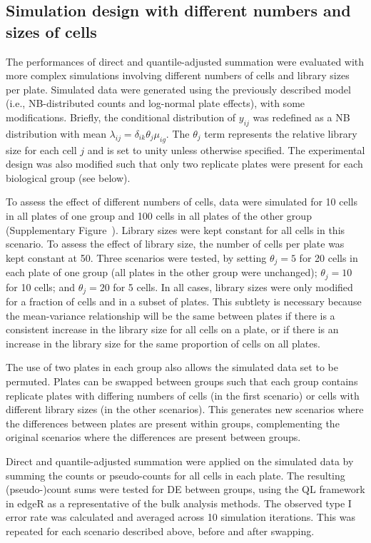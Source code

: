 \documentclass[oupdraft]{bio}
\begin{document}
\subsection{Simulation design with different numbers and sizes of cells}
The performances of direct and quantile-adjusted summation were evaluated with more complex simulations involving different numbers of cells and library sizes per plate.
Simulated data were generated using the previously described model (i.e., NB-distributed counts and log-normal plate effects), with some modifications.
Briefly, the conditional distribution of $y_{ij}$ was redefined as a NB distribution with mean $\lambda_{ij} = \delta_{ik}\theta_{j}\mu_{ig}$.
The $\theta_{j}$ term represents the relative library size for each cell $j$ and is set to unity unless otherwise specified.
The experimental design was also modified such that only two replicate plates were present for each biological group (see below).

To assess the effect of different numbers of cells, data were simulated for 10 cells in all plates of one group and 100 cells in all plates of the other group (Supplementary Figure~\suppcompsim{}).
Library sizes were kept constant for all cells in this scenario.
To assess the effect of library size, the number of cells per plate was kept constant at 50.
Three scenarios were tested, by setting $\theta_j=5$ for 20 cells in each plate of one group (all plates in the other group were unchanged);
    $\theta_j=10$ for 10 cells; and $\theta_j=20$ for 5 cells.
In all cases, library sizes were only modified for a fraction of cells and in a subset of plates.
This subtlety is necessary because the mean-variance relationship will be the same between plates if there is a consistent increase in the library size for all cells on a plate, 
    or if there is an increase in the library size for the same proportion of cells on all plates.

The use of two plates in each group also allows the simulated data set to be permuted.
Plates can be swapped between groups such that each group contains replicate plates with differing numbers of cells (in the first scenario)
    or cells with different library sizes (in the other scenarios).
This generates new scenarios where the differences between plates are present within groups, 
    complementing the original scenarios where the differences are present between groups.

Direct and quantile-adjusted summation were applied on the simulated data by summing the counts or pseudo-counts for all cells in each plate.
The resulting (pseudo-)count sums were tested for DE between groups, using the QL framework in edgeR as a representative of the bulk analysis methods.
The observed type I error rate was calculated and averaged across 10 simulation iterations.
This was repeated for each scenario described above, before and after swapping.
\end{document}
